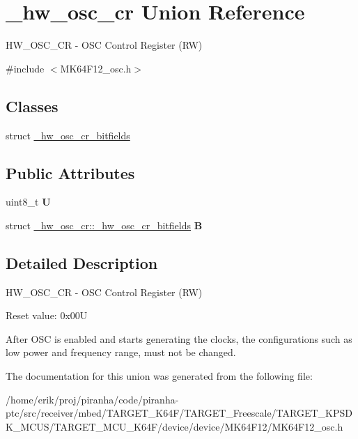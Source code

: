 \hypertarget{union__hw__osc__cr}{}\section{\+\_\+hw\+\_\+osc\+\_\+cr Union Reference}
\label{union__hw__osc__cr}


H\+W\+\_\+\+O\+S\+C\+\_\+\+CR -\/ O\+SC Control Register (RW)  




{\ttfamily \#include $<$M\+K64\+F12\+\_\+osc.\+h$>$}

\subsection*{Classes}
\begin{DoxyCompactItemize}
\item 
struct \hyperlink{struct__hw__osc__cr_1_1__hw__osc__cr__bitfields}{\+\_\+hw\+\_\+osc\+\_\+cr\+\_\+bitfields}
\end{DoxyCompactItemize}
\subsection*{Public Attributes}
\begin{DoxyCompactItemize}
\item 
uint8\+\_\+t {\bfseries U}\hypertarget{union__hw__osc__cr_a4b073dde79854add0debbbc8d762d021}{}\label{union__hw__osc__cr_a4b073dde79854add0debbbc8d762d021}

\item 
struct \hyperlink{struct__hw__osc__cr_1_1__hw__osc__cr__bitfields}{\+\_\+hw\+\_\+osc\+\_\+cr\+::\+\_\+hw\+\_\+osc\+\_\+cr\+\_\+bitfields} {\bfseries B}\hypertarget{union__hw__osc__cr_a2201d28d7ba70343bd4f9e5d503e2f93}{}\label{union__hw__osc__cr_a2201d28d7ba70343bd4f9e5d503e2f93}

\end{DoxyCompactItemize}


\subsection{Detailed Description}
H\+W\+\_\+\+O\+S\+C\+\_\+\+CR -\/ O\+SC Control Register (RW) 

Reset value\+: 0x00U

After O\+SC is enabled and starts generating the clocks, the configurations such as low power and frequency range, must not be changed. 

The documentation for this union was generated from the following file\+:\begin{DoxyCompactItemize}
\item 
/home/erik/proj/piranha/code/piranha-\/ptc/src/receiver/mbed/\+T\+A\+R\+G\+E\+T\+\_\+\+K64\+F/\+T\+A\+R\+G\+E\+T\+\_\+\+Freescale/\+T\+A\+R\+G\+E\+T\+\_\+\+K\+P\+S\+D\+K\+\_\+\+M\+C\+U\+S/\+T\+A\+R\+G\+E\+T\+\_\+\+M\+C\+U\+\_\+\+K64\+F/device/device/\+M\+K64\+F12/M\+K64\+F12\+\_\+osc.\+h\end{DoxyCompactItemize}
